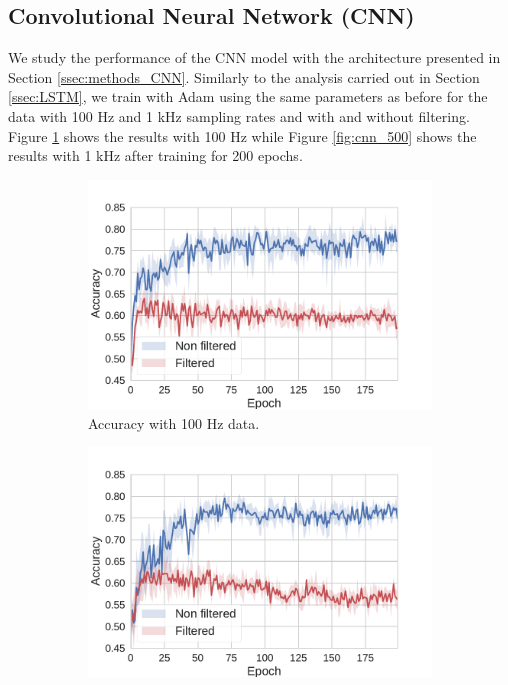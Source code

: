 \documentclass[10pt,conference,compsocconf]{IEEEtran}
\begin{document}
    \subsection{Convolutional Neural Network (CNN)} %
    \label{ssec:CNN}
    We study the performance of the CNN model with the architecture presented in Section \ref{ssec:methods_CNN}. Similarly to the analysis carried out in Section \ref{ssec:LSTM}, we train with Adam using the same parameters as before for the data with 100 Hz and 1 kHz sampling rates and with and without filtering. Figure \ref{fig:cnn_50} shows the results with 100 Hz while Figure \ref{fig:cnn_500} shows the results with 1 kHz after training for 200 epochs.

    \begin{figure}[t]
        \begin{subfigure}{0.5\textwidth}
            \centering
            \includegraphics[width=\textwidth]{figures/cnn_50.pdf}
            \caption{Accuracy with 100 Hz data.}
            \label{fig:cnn_50}
        \end{subfigure}
        \begin{subfigure}{0.5\textwidth}
            \centering
            \includegraphics[width=\textwidth]{figures/cnn_500.pdf}

\end{subfigure}
\end{figure}
\end{document}
